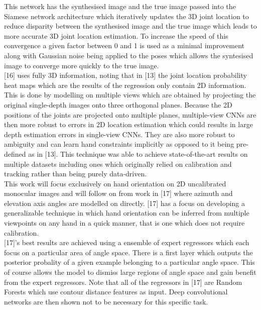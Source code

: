 \documentclass{article}
\begin{document}
This network has the synthesised image and the true image passed into the Siamese network architecture which iteratively updates the 3D joint location to reduce disparity between the synthesised image and the true image which leads to more accurate 3D joint location estimation. To increase the speed of this convergence a given factor between 0 and 1 is used as a minimal improvement along with Gaussian noise being applied to the poses which allows the syntesised image to converge more quickly to the true image.\\

[16] uses fully 3D information, noting that in [13] the joint location probability heat maps which are the results of the regression only contain 2D information. This is done by modelling on multiple views which are obtained by projecting the original single-depth images onto three orthogonal planes. Because the 2D positions of the joints are projected onto multiple planes, multiple-view CNNs are then more robust to errors in 2D location estimation which could results in large depth estimation errors in single-view CNNs. They are also more robust to ambiguity and can learn hand constraints implicitly as opposed to it being pre-defined as in [13]. This technique was able to achieve state-of-the-art results on multiple datasets including ones which originally relied on calibration and tracking rather than being purely data-driven.\\

This work will focus exclusively on hand orientation on 2D uncalibrated monocular images and will follow on from work in [17] where azimuth and elevation axis angles are modelled on directly. [17] has a focus on developing a generalizable technique in which hand orientation can be inferred from multiple viewpoints on any hand in a quick manner, that is one which does not require calibration.\\

[17]'s best results are achieved using a ensemble of expert regressors which each focus on a particular area of angle space.  There is a first layer which outputs the posterior probality of a given example belonging to a particular angle space. This of course allows the model to dismiss large regions of angle space and gain benefit from the expert regressors. Note that all of the regressors in [17] are Random Forests which use contour distance features as input. Deep convolutional networks are then shown not to be necessary for this specific task.\\
\end{document}
